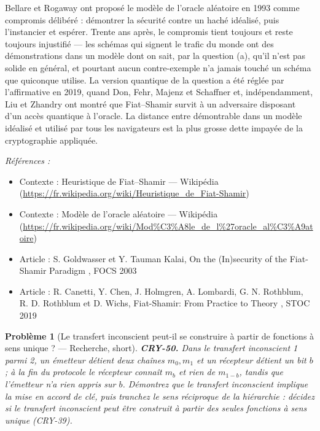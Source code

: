 \documentclass[11pt]{article}
\newtheorem{problem}{Problème}
\newenvironment{refs}{\par\small\noindent\emph{Références :}\begin{itemize}\setlength\itemsep{0pt}}{\end{itemize}\normalsize}
\begin{document}
\noindent Bellare et Rogaway ont proposé le modèle de l'oracle aléatoire en 1993
comme compromis délibéré : démontrer la sécurité contre un haché idéalisé, puis l'instancier
et espérer. Trente ans après, le compromis tient toujours et reste toujours injustifié --- les
schémas qui signent le trafic du monde ont des démonstrations dans un modèle dont on sait, par
la question (a), qu'il n'est pas solide en général, et pourtant aucun contre-exemple n'a jamais
touché un schéma que quiconque utilise. La version quantique de la question a été réglée par
l'affirmative en 2019, quand Don, Fehr, Majenz et Schaffner et, indépendamment, Liu et Zhandry
ont montré que Fiat--Shamir survit à un adversaire disposant d'un accès quantique à l'oracle.
La distance entre \og{} démontrable dans un modèle idéalisé \fg{} et \og{} utilisé par tous les
navigateurs \fg{} est la plus grosse dette impayée de la cryptographie appliquée.

\begin{refs}
\item Contexte : Heuristique de Fiat--Shamir --- Wikipédia (\url{https://fr.wikipedia.org/wiki/Heuristique_de_Fiat-Shamir})
\item Contexte : Modèle de l'oracle aléatoire --- Wikipédia (\url{https://fr.wikipedia.org/wiki/Mod%C3%A8le_de_l%27oracle_al%C3%A9atoire})
\item Article : S. Goldwasser et Y. Tauman Kalai, \og{} On the (In)security of the Fiat-Shamir Paradigm \fg{}, FOCS 2003
\item Article : R. Canetti, Y. Chen, J. Holmgren, A. Lombardi, G. N. Rothblum, R. D. Rothblum et D. Wichs, \og{} Fiat-Shamir: From Practice to Theory \fg{}, STOC 2019
\end{refs}

\bigskip

\begin{problem}[{Le transfert inconscient peut-il se construire à partir de fonctions à sens unique ? --- Recherche, short}]
\textbf{CRY-50.} Dans le \textit{transfert inconscient} 1 parmi 2, un émetteur
détient deux chaînes $m_0, m_1$ et un récepteur détient un bit $b$ ; à la fin du protocole
le récepteur connaît $m_b$ et rien de $m_{1-b}$, tandis que l'émetteur n'a rien appris
sur $b$. Démontrez que le transfert inconscient implique la mise en accord de clé, puis
tranchez le sens réciproque de la hiérarchie : décidez si le transfert inconscient peut être
construit à partir des seules fonctions à sens unique (CRY-39).
\end{problem}
\end{document}
